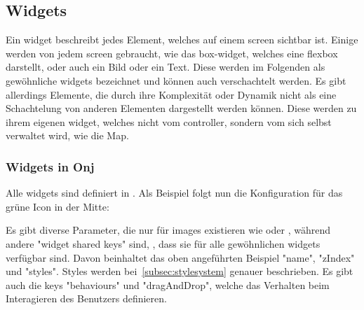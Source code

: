 
\renewcommand{\kapitelautor}{Autor: Felix Zwickelstorfer}
\subsection{Widgets}\label{sec:widgets}
\renewcommand{\kapitelautor}{Autor: Felix Zwickelstorfer}
Ein widget beschreibt jedes Element, welches auf einem screen sichtbar ist. 
Einige werden von jedem screen gebraucht, wie \zB das box-widget, welches eine flexbox darstellt, oder auch ein Bild oder ein Text.
Diese werden im Folgenden als gewöhnliche widgets bezeichnet und können auch verschachtelt werden.
Es gibt allerdings Elemente, die durch ihre Komplexität oder Dynamik nicht als eine Schachtelung von anderen Elementen dargestellt werden können. 
Diese werden zu ihrem eigenen widget, welches nicht vom controller, sondern vom sich selbst verwaltet wird, wie \zB die Map.
\renewcommand{\kapitelautor}{Autor: Felix Zwickelstorfer}
\subsubsection{Widgets in Onj}\label{subsubsec:widgetsinonj}
\renewcommand{\kapitelautor}{Autor: Felix Zwickelstorfer}

Alle widgets sind definiert in .
Als Beispiel folgt nun die Konfiguration für das grüne Icon in der Mitte:
Es gibt diverse Parameter, die nur für images existieren wie \zB {} oder , während andere "widget shared keys" sind, \dah, dass sie für alle gewöhnlichen widgets verfügbar sind.
Davon beinhaltet das oben angeführten Beispiel "name", "zIndex" und "styles".
Styles werden bei~\ref{subsec:stylesystem} genauer beschrieben.
Es gibt auch die keys "behaviours" und "dragAndDrop", welche das Verhalten beim Interagieren des Benutzers definieren.

